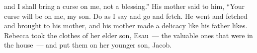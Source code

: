 \begin{inparaenum}
  and I shall bring a curse on me, not a blessing.''%
   His mother said to him, ``Your curse will be on me, my son. Do as I say%
  and go and fetch.\understood{}%
   He went and fetched and brought to his mother, and his mother made a delicacy like his father likes.%
   Rebecca took the clothes of her elder son, Esau~--- the valuable ones that were in the house~--- and put them on her younger son, Jacob.%





\end{inparaenum}

